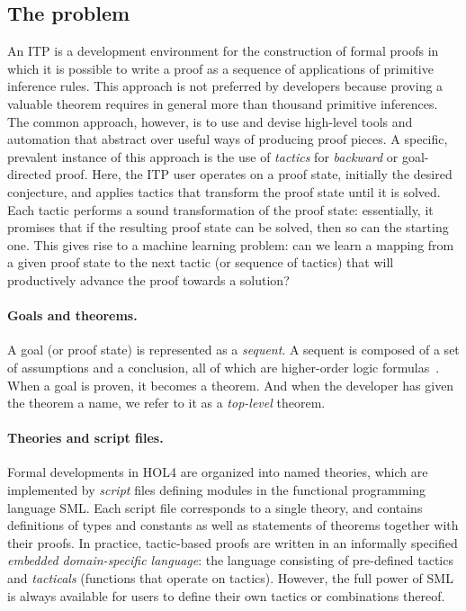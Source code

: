 \documentclass[runningheads,a4paper,draft]{svjour3}
\def\holfour{\textsf{HOL4}\xspace}
\def\sml{\textsf{SML}\xspace}
\begin{document}
\subsection{The problem}
An ITP is a development environment for the construction of formal proofs in 
which it is possible to write a proof as a sequence of 
applications of primitive inference rules. This approach is not preferred 
by developers because proving a valuable theorem requires in general more than 
thousand primitive inferences.
The common approach, however, is to use and devise high-level tools and 
automation that abstract over useful ways of producing proof pieces.
A specific, prevalent instance of this approach is the use of \emph{tactics} 
for \emph{backward} or goal-directed proof.
Here, the ITP user operates on a proof state, initially the desired conjecture, 
and applies tactics that transform the proof state until it is solved.
Each tactic performs a sound transformation of the proof state: essentially, it 
promises that if the resulting proof state can be solved, then so can the 
starting one. This gives rise to a machine learning problem: can we learn a 
mapping from a given proof state to the next tactic (or sequence of tactics) 
that will productively advance the proof towards a solution?

\paragraph{Goals and theorems.}
A goal (or proof state) is represented as a \emph{sequent}.
A sequent is composed of a set of assumptions and a conclusion, all of which 
are higher-order logic formulas~\cite{gordon01hol}.
When a goal is proven, it becomes a theorem.
And when the developer has given the theorem a name, we refer to it as a 
\textit{top-level} theorem.

\paragraph{Theories and script files.}
Formal developments in \holfour are organized into named theories, which are
implemented by \emph{script} files defining modules in the
functional programming language \sml.
Each script file corresponds to a single theory, and contains definitions of
types and constants as well as statements of theorems together with their
proofs.
In practice, tactic-based proofs are written in an informally specified
\emph{embedded domain-specific language}: the language consisting of
pre-defined tactics and \emph{tacticals} (functions that operate on tactics).
However, the full power of \sml is always available for users to define their
own tactics or combinations thereof.
\end{document}

